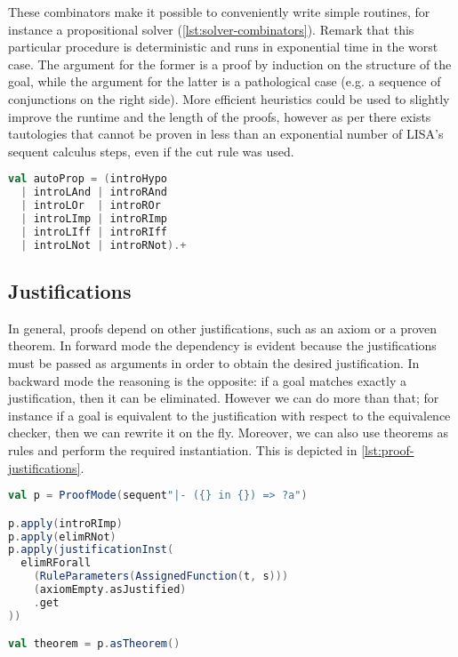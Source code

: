 These combinators make it possible to conveniently write simple routines, for instance a propositional solver (\autoref{lst:solver-combinators}). Remark that this particular procedure is deterministic and runs in exponential time in the worst case. The argument for the former is a proof by induction on the structure of the goal, while the argument for the latter is a pathological case (e.g. a sequence of conjunctions on the right side). More efficient heuristics could be used to slightly improve the runtime and the length of the proofs, however as per \cite{Krajicek1994} there exists tautologies that cannot be proven in less than an exponential number of LISA's sequent calculus steps, even if the cut rule was used.

\begin{lstlisting}[language=Scala,caption={[Propositional solver]{A propositional solver written using exclusively rules and tactic combinators.}},label={lst:solver-combinators},captionpos=b]
val autoProp = (introHypo
  | introLAnd | introRAnd
  | introLOr  | introROr
  | introLImp | introRImp
  | introLIff | introRIff
  | introLNot | introRNot).+
\end{lstlisting}

\subsection{Justifications}
\label{sec:proof-framework-justifications}

In general, proofs depend on other justifications, such as an axiom or a proven theorem. In forward mode the dependency is evident because the justifications must be passed as arguments in order to obtain the desired justification. In backward mode the reasoning is the opposite: if a goal matches exactly a justification, then it can be eliminated. However we can do more than that; for instance if a goal is equivalent to the justification with respect to the equivalence checker, then we can rewrite it on the fly. Moreover, we can also use theorems as rules and perform the required instantiation. This is depicted in \autoref{lst:proof-justifications}.

\begin{lstlisting}[language=Scala,caption={[Proof with justifications]{Example of a proof with justifications.}},label={lst:proof-justifications},captionpos=b]
val p = ProofMode(sequent"|- ({} in {}) => ?a")

p.apply(introRImp)
p.apply(elimRNot)
p.apply(justificationInst(
  elimRForall
    (RuleParameters(AssignedFunction(t, s)))
    (axiomEmpty.asJustified)
    .get
))

val theorem = p.asTheorem()
\end{lstlisting}

